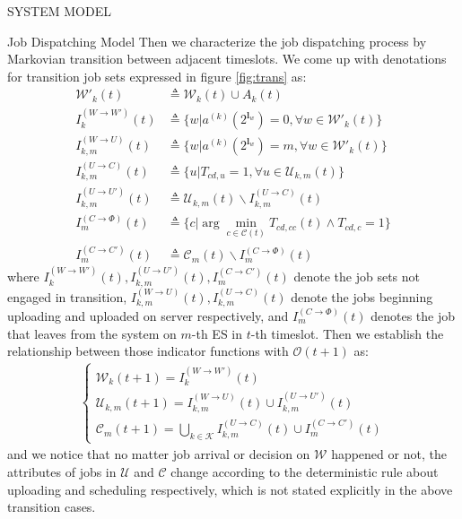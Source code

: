 \documentclass[10pt, conference, letterpaper]{IEEEtran}
\newcommand{\eq}{=}
\renewcommand{\vec}{\mathbf}
\newcommand{\apSet}{\mathcal{K}}
\newcommand{\wSet}{\mathcal{W}}
\newcommand{\uSet}{\mathcal{U}}
\newcommand{\cSet}{\mathcal{C}}
\begin{document}
\begin{section}{SYSTEM MODEL}
\begin{subsection}{Job Dispatching Model}
            Then we characterize the job dispatching process by Markovian transition between adjacent timeslots.
            We come up with denotations for transition job sets expressed in figure \ref{fig:trans} as:
            \begin{align}
                \wSet'_{k}(t) &\triangleq \wSet_{k}(t) \cup A_k(t)
                \\
                I^{(W \to W')}_{k}(t) & \triangleq \{ w | a^{(k)}(2^{\vec{l}_w})\eq0, \forall w \in \wSet'_{k}(t) \}
                \\
                I^{(W \to U)}_{k,m}(t) &\triangleq \{ w | a^{(k)}(2^{\vec{l}_w})=m, \forall w \in \wSet'_{k}(t) \}
                \\
                I^{(U \to C)}_{k,m}(t) &\triangleq \{ u | T_{cd,u}=1, \forall u \in \uSet_{k,m}(t)\}
                \\
                I^{(U \to U')}_{k,m}(t) &\triangleq \uSet_{k,m}(t) \backslash I^{(U \to C)}_{k,m}(t)
                \\
                I^{(C \to \Phi)}_{m}(t) &\triangleq \{ c | \arg\min_{c\in\cSet(t)} T_{cd,cc}(t) \wedge T_{cd,c}=1\}
                \\
                I^{(C \to C')}_{m}(t) &\triangleq \cSet_{m}(t) \backslash I^{(C \to \Phi)}_{m}(t)
            \end{align}
            where $I^{(W \to W')}_{k}(t), I^{(U \to U')}_{k,m}(t), I^{(C \to C')}_{m}(t)$ denote the job sets not engaged in transition, $I^{(W \to U)}_{k,m}(t), I^{(U \to C)}_{k,m}(t)$ denote the jobs beginning uploading and uploaded on server respectively, and $I^{(C \to \Phi)}_{m}(t)$ denotes the job that leaves from the system on $m$-th ES in $t$-th timeslot.
            Then we establish the relationship between those indicator functions with $\mathcal{O}(t+1)$ as:
            \begin{align}
                \begin{cases}
                    \wSet_{k}(t+1) = I^{(W \to W')}_{k}(t)
                    \\
                    \uSet_{k,m}(t+1) = I^{(W \to U)}_{k,m}(t) \cup I^{(U \to U')}_{k,m}(t)
                    \\
                    \cSet_{m}(t+1) = \bigcup\limits_{k\in\apSet} I^{(U \to C)}_{k,m}(t) \cup I^{(C \to C')}_{m}(t)
                \end{cases}
            \end{align}
            and we notice that no matter job arrival or decision on $\wSet$ happened or not, the attributes of jobs in $\uSet$ and $\cSet$ change according to the deterministic rule about uploading and scheduling respectively, which is not stated explicitly in the above transition cases.


\end{subsection}
\end{section}
\end{document}
